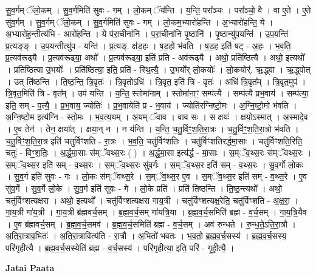 \documentclass[17pt]{extarticle}
\begin{document}
सु॒व॒र्गम् ॅलो॒कम् । सु॒व॒र्गमिति॑ सुवः - गम् । लो॒कम् ॅय॑न्ति । य॒न्ति॒ परा᳚ञ्चः । परा᳚ञ्चो॒ वै । वा ए॒ते । ए॒ते सु॑व॒र्गम् । सु॒व॒र्गम् ॅलो॒कम् । सु॒व॒र्गमिति॑ सुवः - गम् । लो॒कम॒भ्यारो॑हन्ति । अ॒भ्यारो॑हन्ति॒ ये । अ॒भ्यारो॑ह॒न्तीत्य॑भि - आरो॑हन्ति । ये प॑रा॒चीना॑नि । प॒रा॒चीना॑नि पृ॒ष्ठानि॑ । पृ॒ष्ठान्यु॑प॒यन्ति॑ । उ॒प॒यन्ति॑ प्र॒त्यङ्‍ङ् । उ॒प॒यन्तीत्यु॑प - यन्ति॑ । प्र॒त्यङ्.‍ क्ष॑ड॒हः । ष॒ड॒हो भ॑वति । ष॒ड॒ह इति॑ षट् - अ॒हः । भ॒व॒ति॒ प्र॒त्यव॑रूढ्‍यै । प्र॒त्यव॑रूढ्‍या॒ अथो᳚ । प्र॒त्यव॑रूढ्‍या॒ इति॑ प्रति - अव॑रूढ्‍यै । अथो॒ प्रति॑ष्ठित्यै । अथो॒ इत्यथो᳚ । प्रति॑ष्ठित्या उ॒भयोः᳚ । प्रति॑ष्ठित्या॒ इति॒ प्रति॑ - स्थि॒त्यै॒ । उ॒भयो᳚र् लो॒कयोः᳚ । लो॒कयोर्॑. ऋ॒द्ध्वा । ऋ॒द्ध्वोत् । उत् ति॑ष्ठन्ति । ति॒ष्ठ॒न्ति॒ त्रि॒वृतः॑ । त्रि॒वृतोऽधि॑ । त्रि॒वृत॒ इति॑ त्रि - वृतः॑ । अधि॑ त्रि॒वृत᳚म् । त्रि॒वृत॒मुप॑ । त्रि॒वृत॒मिति॑ त्रि - वृत᳚म् । उप॑ यन्ति । य॒न्ति॒ स्तोमा॑नाम् । स्तोमा॑नाꣳ॒॒ सम्प॑त्यै । सम्प॑त्यै प्रभ॒वाय॑ । सम्प॑त्या॒ इति॒ सम् - प॒त्यै॒ । प्र॒भ॒वाय॒ ज्योतिः॑ । प्र॒भ॒वायेति॑ प्र - भ॒वाय॑ । ज्योति॑रग्निष्टो॒मः । अ॒ग्नि॒ष्टो॒मो भ॑वति । अ॒ग्नि॒ष्टो॒म इत्य॑ग्नि - स्तो॒मः । भ॒व॒त्य॒यम् । अ॒यम् ॅवाव । वाव सः । स क्षयः॑ । क्षयो॒ऽस्मात् । अ॒स्मादे॒व । ए॒व तेन॑ । तेन॒ क्षया᳚त् । क्षया॒न् न । न य॑न्ति । य॒न्ति॒ च॒तु॒र्विꣳ॒॒श॒ति॒रा॒त्रः । च॒तु॒र्विꣳ॒॒श॒ति॒रा॒त्रो भ॑वति । च॒तु॒र्विꣳ॒॒श॒ति॒रा॒त्र इति॑ चतुर्विꣳशति - रा॒त्रः । भ॒व॒ति॒ चतु॑र्विꣳशतिः । चतु॑र्विꣳशतिरर्द्धमा॒साः । चतु॑र्विꣳशति॒रिति॒ चतुः॑ - विꣳ॒॒श॒तिः॒ । अ॒र्द्ध॒मा॒साः स॑म्ॅवथ्स॒रः ( ) । अ॒र्द्ध॒मा॒सा इत्य॑र्द्ध - मा॒साः । स॒म्ॅव॒थ्स॒रः स॑म्ॅवथ्स॒रः । स॒म्ॅव॒थ्स॒र इति॑ सम् - व॒थ्स॒रः । स॒म्ॅव॒थ्स॒रः सु॑व॒र्गः । स॒म्ॅव॒थ्स॒र इति॑ सम् - व॒थ्स॒रः । सु॒व॒र्गो लो॒कः । सु॒व॒र्ग इति॑ सुवः - गः । लो॒कः स॑म्ॅवथ्स॒रे । स॒म्ॅव॒थ्स॒र ए॒व । स॒म्ॅव॒थ्स॒र इति॑ सम् - व॒थ्स॒रे । ए॒व सु॑व॒र्गे । सु॒व॒र्गे लो॒के । सु॒व॒र्ग इति॑ सुवः - गे । लो॒के प्रति॑ । प्रति॑ तिष्ठन्ति । ति॒ष्ठ॒न्त्यथो᳚ । अथो॒ चतु॑र्विꣳशत्यक्षरा । अथो॒ इत्यथो᳚ । चतु॑र्विꣳशत्यक्षरा गाय॒त्री । चतु॑र्विꣳशत्यक्ष॒रेति॒ चतु॑र्विꣳशति - अ॒क्ष॒रा॒ । गा॒य॒त्री गा॑य॒त्री । गा॒य॒त्री ब्र॑ह्मवर्च॒सम् । ब्र॒ह्म॒व॒र्च॒सम् गा॑यत्रि॒या । ब्र॒ह्म॒व॒र्च॒समिति॑ ब्रह्म - व॒र्च॒सम् । गा॒य॒त्रि॒यैव । ए॒व ब्र॑ह्मवर्च॒सम् । ब्र॒ह्म॒व॒र्च॒समव॑ । ब्र॒ह्म॒व॒र्च॒समिति॑ ब्रह्म - व॒र्च॒सम् । अव॑ रुन्धते । रु॒न्ध॒ते॒ऽति॒रा॒त्रौ । अ॒ति॒रा॒त्राव॒भितः॑ । अ॒ति॒रा॒त्रावित्य॑ति - रा॒त्रौ । अ॒भितो॑ भवतः । भ॒व॒तो॒ ब्र॒ह्म॒व॒र्च॒सस्य॑ । ब्र॒ह्म॒व॒र्च॒सस्य॒ परि॑गृहीत्यै । ब्र॒ह्म॒व॒र्च॒सस्येति॑ ब्रह्म - व॒र्च॒सस्य॑ । परि॑गृहीत्या॒ इति॒ परि॑ - गृ॒ही॒त्यै॒ । \newline

\textbf{Jatai Paata} \newline
\end{document}
